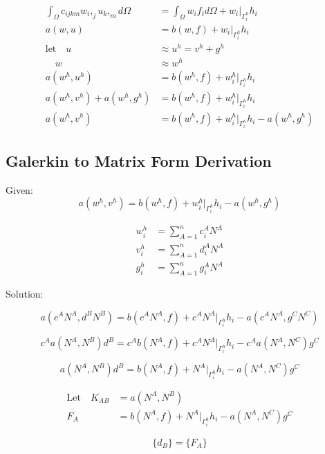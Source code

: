 \documentclass[a4paper, 12pt]{article}
\begin{document}
\begin{align*}
\int_{\Omega} c_{ijkm} w_{i},_{j} u_{k},_{m} d\Omega
 &= \int_{\Omega} w_{i} f_{i} d\Omega
  + w_{i}\Big|_{\Gamma^{h}_{i}} h_{i} \\
a(w, u)
 &= b(w , f)
  + w_{i}\Big|_{\Gamma^{h}_{i}} h_{i}  \\
\text{let} \quad u &\approx u^{h} = v^{h} + g^{h} \\
 \quad w &\approx w^{h} \\
a(w^{h} , u^{h} )
 &= b(w^{h}, f)
  + w^{h}_{i}\Big|_{\Gamma^{h}_{i}} h_{i}  \\
a(w^{h} , v^{h} )
  + a(w^{h} , g^{h} )
 &= b(w^{h}, f)
  + w^{h}_{i}\Big|_{\Gamma^{h}_{i}} h_{i}  \\
a(w^{h} , v^{h})
 &= b(w^{h} , f)
  + w^{h}_{i}\Big|_{\Gamma^{h}_{i}} h_{i}
  - a(w^{h} , g^{h})
\end{align*}

\newpage
\subsection{Galerkin to Matrix Form Derivation} \label{sec:MatrixDer}

Given:
\begin{equation*}
a(w^{h} , v^{h})
 = b(w^{h} , f)
  + w^{h}_{i}\Big|_{\Gamma^{h}_{i}} h_{i}
  - a(w^{h} , g^{h})
\end{equation*}

\begin{align*}
w^{h}_i &= \sum_{A=1}^{n} c^{A}_i N^{A}  \\
v^{h}_i &= \sum_{A=1}^{n} d^{A}_i N^{A}  \\
g^{h}_i &=  \sum_{A=1}^{n} g^{A}_i N^{A}
\end{align*}

\noindent
Solution:

\begin{equation*}
a(c^{A} N^{A}, d^{B} N^{B})
 = b( c^{A} N^{A} , f)
  + c^{A} N^{A}\Big|_{\Gamma^{h}_{i}} h_{i}
  - a( c^{A} N^{A}, g^{C} N^{C})
\end{equation*}

\begin{equation*}
c^{A} a(N^{A}, N^{B})d^{B}
 = c^{A} b( N^{A} , f)
  + c^{A} N^{A}\Big|_{\Gamma^{h}_{i}} h_{i}
  - c^{A}a( N^{A}, N^{C})g^{C}
\end{equation*}

\begin{equation*}
a(N^{A}, N^{B})d^{B}
 = b( N^{A} , f)
  + N^{A}\Big|_{\Gamma^{h}_{i}} h_{i}
  - a( N^{A}, N^{C})g^{C}
\end{equation*}

\begin{align*}
\text{Let}\quad K_{AB} &= a(N^{A}, N^{B}) \\
F_A &= b( N^{A} , f)
  + N^{A}\Big|_{\Gamma^{h}_{i}} h_{i}
  - a( N^{A}, N^{C})g^{C}
\end{align*}

\begin{equation*}
[ K_{AB} ] \{ d_B \} = \{ F_A \}
\end{equation*}
\end{document}

